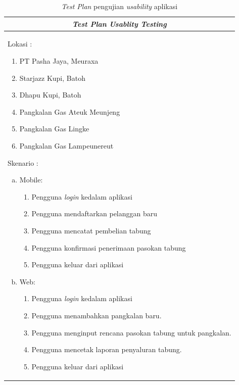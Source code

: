 		\begin{center}
		\begin{table}[H]
			\center
			\caption{\textit{Test Plan }pengujian \textit{usability} aplikasi}
			\label{test plan}
			\begin{tabular}{ |p{12cm}|  }
				\hline
				\multicolumn{1}{|c|}{\textbf{\textit{Test Plan} \textit{Usablity Testing}}} \\
				\hline
				Lokasi :
				\begin{enumerate}
					\item PT Pasha Jaya, Meuraxa
					\item Starjazz Kupi, Batoh
					\item Dhapu Kupi, Batoh
					\item Pangkalan Gas Ateuk Meunjeng
					\item Pangkalan Gas Lingke
					\item Pangkalan Gas Lampeunereut
				\end{enumerate}
				Skenario :
				\begin{enumerate}[a.]
					\item Mobile:
						\begin{enumerate}[1.]
							\item Pengguna \textit{login} kedalam aplikasi
							\item Pengguna mendaftarkan pelanggan baru
							\item Pengguna mencatat pembelian tabung 
							\item Pengguna konfirmasi penerimaan pasokan tabung
							\item Pengguna keluar dari aplikasi
							
						\end{enumerate}
					\item Web:
						\begin{enumerate}[1.]
							\item Pengguna \textit{login} kedalam aplikasi
							\item Pengguna menambahkan pangkalan baru.
							\item Pengguna menginput rencana pasokan tabung untuk pangkalan.
							\item Pengguna mencetak laporan penyaluran tabung.
							\item Pengguna keluar dari aplikasi
							
						\end{enumerate}
				\end{enumerate}
				 \\
				\hline
			\end{tabular}
		\end{table}
	\end{center}

